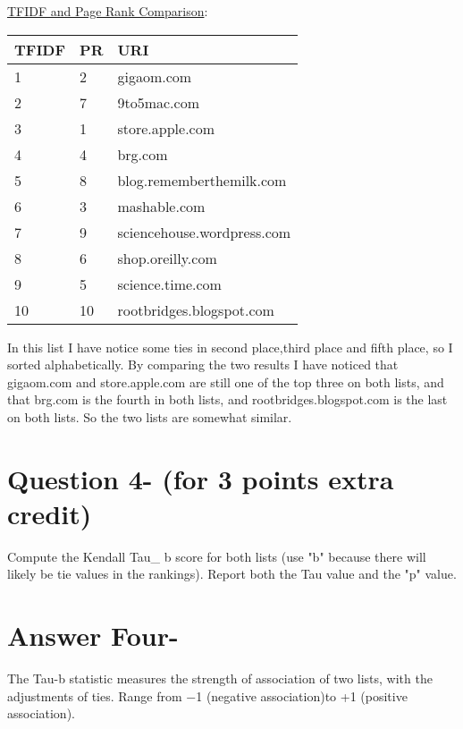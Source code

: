 \documentclass[letterpaper,11pt]{article}
\begin{document}
\uline{TFIDF and Page Rank Comparison}:

\begin{table}[H]
    \begin{tabular}{|| l || l || l ||}\hline
    TFIDF & PR & URI \\\hline
    1  & 2 & gigaom.com \\\hline
    2  & 7 & 9to5mac.com \\\hline
    3  & 1 & store.apple.com \\\hline
    4  & 4 & brg.com \\\hline
    5  & 8 & blog.rememberthemilk.com \\\hline
    6  & 3 & mashable.com \\\hline
    7  & 9 & sciencehouse.wordpress.com \\\hline
    8  & 6 & shop.oreilly.com \\\hline
    9  & 5 & science.time.com \\\hline
    10 & 10 & rootbridges.blogspot.com \\\hline    
    \end{tabular}
    
\end{table}


In this list I have notice some ties in second place,third place and fifth place, so I sorted alphabetically.
By comparing the two results I have noticed that gigaom.com and store.apple.com are still one of the top three on both lists, and that brg.com is the fourth in both lists, and rootbridges.blogspot.com is the last on both lists.
So the two lists are somewhat similar.

\pagebreak
\section*{Question 4- (for 3 points extra credit)}

Compute the Kendall Tau\_ b score for both lists (use "b" because
there will likely be tie values in the rankings).  Report both the
Tau value and the "p" value.
\pagebreak

\section*{Answer Four-}


The Tau-b statistic measures the strength of association of two lists, with the adjustments of ties. Range from −1 (negative association)to +1 (positive association).
\end{document}
